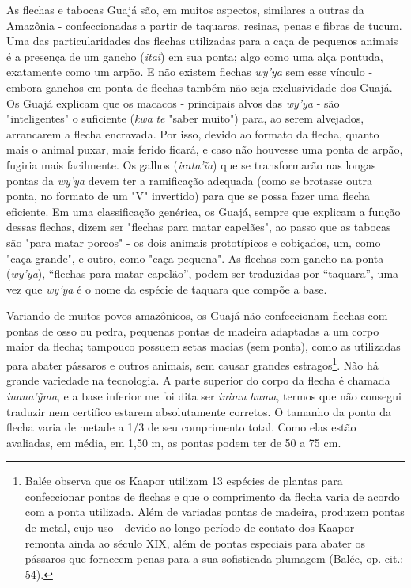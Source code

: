 As flechas e tabocas Guajá são, em muitos aspectos, similares a outras
da Amazônia - confeccionadas a partir de taquaras, resinas, penas e
fibras de tucum. Uma das particularidades das flechas utilizadas para a
caça de pequenos animais é a presença de um gancho (\emph{itaĩ}) em sua
ponta; algo como uma alça pontuda, exatamente como um arpão. E não
existem flechas \emph{wy'ya} sem esse vínculo - embora ganchos em ponta
de flechas também não seja exclusividade dos Guajá. Os Guajá explicam
que os macacos - principais alvos das \emph{wy'ya} - são "inteligentes"
o suficiente (\emph{kwa} \emph{te} "saber muito") para, ao serem
alvejados, arrancarem a flecha encravada. Por isso, devido ao formato da
flecha, quanto mais o animal puxar, mais ferido ficará, e caso não
houvesse uma ponta de arpão, fugiria mais facilmente. Os galhos
(\emph{irata'ĩa}) que se transformarão nas longas pontas da \emph{wy'ya}
devem ter a ramificação adequada (como se brotasse outra ponta, no
formato de um "V" invertido) para que se possa fazer uma flecha
eficiente. Em uma classificação genérica, os Guajá, sempre que explicam
a função dessas flechas, dizem ser "flechas para matar capelães", ao
passo que as tabocas são "para matar porcos" - os dois animais
prototípicos e cobiçados, um, como "caça grande", e outro, como "caça
pequena". As flechas com gancho na ponta (\emph{wy'ya}), ``flechas para
matar capelão'', podem ser traduzidas por ``taquara'', uma vez que
\emph{wy'ya} é o nome da espécie de taquara que compõe a base.

Variando de muitos povos amazônicos, os Guajá não confeccionam flechas
com pontas de osso ou pedra, pequenas pontas de madeira adaptadas a um
corpo maior da flecha; tampouco possuem setas macias (sem ponta), como
as utilizadas para abater pássaros e outros animais, sem causar grandes
estragos\footnote{Balée observa que os Kaapor utilizam 13 espécies de
  plantas para confeccionar pontas de flechas e que o comprimento da
  flecha varia de acordo com a ponta utilizada. Além de variadas pontas
  de madeira, produzem pontas de metal, cujo uso - devido ao longo
  período de contato dos Kaapor - remonta ainda ao século XIX, além de
  pontas especiais para abater os pássaros que fornecem penas para a sua
  sofisticada plumagem (Balée, op. cit.: 54).}. Não há grande variedade
na tecnologia. A parte superior do corpo da flecha é chamada
\emph{inana'ỹma}, e a base inferior me foi dita ser \emph{inimu}
\emph{huma}, termos que não consegui traduzir nem certifico estarem
absolutamente corretos. O tamanho da ponta da flecha varia de metade a
1/3 de seu comprimento total. Como elas estão avaliadas, em média, em
1,50 m, as pontas podem ter de 50 a 75 cm.

